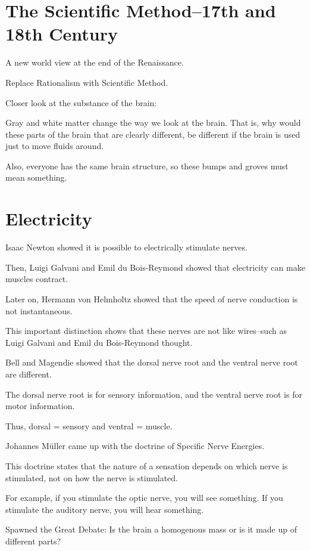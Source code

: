 \section{The Scientific Method--17th and 18th Century}

\begin{coloredlist}
    \item A new world view at the end of the Renaissance.
    \begin{coloredlist}
        \item Replace Rationalism with Scientific Method.
    \end{coloredlist}
    \item Closer look at the substance of the brain:
    \begin{coloredlist}
        \item Gray and white matter change the way we look at the brain. That is, why would these parts of the brain that are clearly different, be different if the brain is used just to move fluids around.
        \item Also, everyone has the same brain structure, so these bumps and groves must mean something.
    \end{coloredlist}
\end{coloredlist}

\section{Electricity}

\begin{coloredlist}
    \item Isaac Newton showed it is possible to electrically stimulate nerves.
    \item Then, Luigi Galvani and Emil du Bois-Reymond showed that electricity can make muscles contract.
    \item Later on, Hermann von Helmholtz showed that the speed of nerve conduction is not instantaneous.
    \item This important distinction shows that these nerves are not like wires--such as Luigi Galvani and Emil du Bois-Reymond thought.
    \item Bell and Magendie showed that the dorsal nerve root and the ventral nerve root are different.
    \item The dorsal nerve root is for sensory information, and the ventral nerve root is for motor information.
    \item Thus, dorsal = sensory and ventral = muscle.
    \item Johannes M\"uller came up with the doctrine of Specific Nerve Energies.
    \item This doctrine states that the nature of a sensation depends on which nerve is stimulated, not on how the nerve is stimulated.
    \item For example, if you stimulate the optic nerve, you will see something. If you stimulate the auditory nerve, you will hear something.
    \item Spawned the Great Debate: Is the brain a homogenous mass or is it made up of different parts?
\end{coloredlist}

